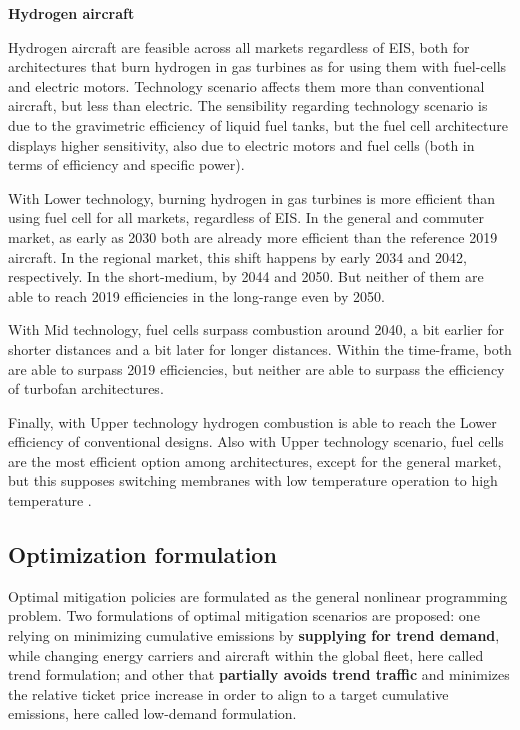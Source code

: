 \documentclass[a4paper,fleqn]{cas-dc}
\begin{document}
\textbf{Hydrogen aircraft}

Hydrogen aircraft are feasible across all markets regardless of EIS, both for architectures that burn hydrogen in gas turbines as for using them with fuel-cells and electric motors. Technology scenario affects them more than conventional aircraft, but less than electric. The sensibility regarding technology scenario is due to the gravimetric efficiency of liquid fuel tanks, but the fuel cell architecture displays higher sensitivity, also due to electric motors and fuel cells (both in terms of efficiency and specific power).

With Lower technology, burning hydrogen in gas turbines is more efficient than using fuel cell for all markets, regardless of  EIS. In the general and commuter market, as early as 2030 both are already more efficient than the reference 2019 aircraft. In the regional market, this shift happens by early 2034 and 2042, respectively. In the short-medium, by 2044 and 2050. But neither of them are able to reach 2019 efficiencies in the long-range even by 2050.

With Mid technology, fuel cells surpass combustion around 2040, a bit earlier for shorter distances and a bit later for longer distances. Within the time-frame, both are able to surpass 2019 efficiencies, but neither are able to surpass the efficiency of turbofan architectures.

Finally, with Upper technology hydrogen combustion is able to reach the Lower efficiency of conventional designs. Also with Upper technology scenario, fuel cells are the most efficient option among architectures, except for the general market, but this supposes switching membranes with low temperature operation to high temperature \cite{ati_fuelcell}.

\subsection{Optimization formulation}

Optimal mitigation policies are formulated as the general nonlinear programming problem. Two formulations of optimal mitigation scenarios are proposed: one relying on minimizing cumulative emissions by \textbf{supplying for trend demand}, while changing energy carriers and aircraft within the global fleet, here called trend formulation; and other that \textbf{partially avoids trend traffic} and minimizes the relative ticket price increase in order to align to a target cumulative emissions, here called low-demand formulation.
\end{document}
